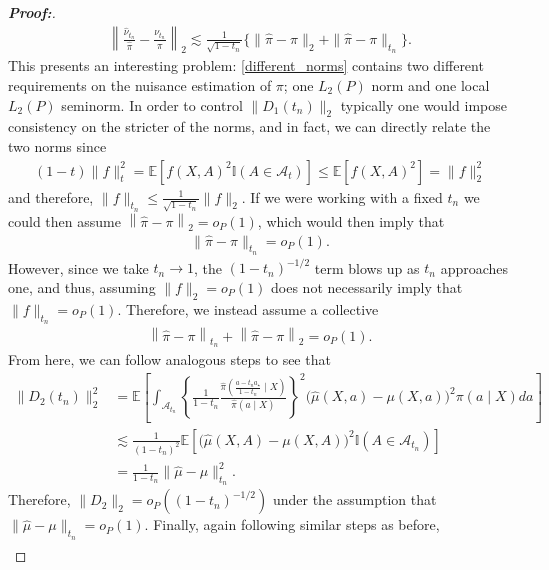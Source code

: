 \documentclass[11pt,twoside]{article}
\theoremstyle{definition}
\theoremstyle{remark}
\begin{document}
\begin{proof}[\textbf{Proof:}]
\begin{align} \label{different_norms}
    \left\| \frac{\widehat{\nu}_{t_n}}{\widehat{\pi}} - \frac{\nu_{t_n}}{\pi} \right\|_2 \lesssim \frac{1}{\sqrt{1 - t_n}} \Big\{ \|\widehat\pi-\pi\|_{2} + \|\widehat\pi-\pi\|_{t_n} \Big\}.
\end{align}
This presents an interesting problem: \cref{different_norms} contains two different requirements on the nuisance estimation of $\pi$; one $L_2(P)$ norm and one local $L_2(P)$ seminorm. In order to control $\|D_1(t_n)\|_2$ typically one would impose consistency on the stricter of the norms, and in fact, we can directly relate the two norms since
\begin{align*}
    (1-t ) \|f\|^2_{t} = \mathbb{E}\left[ f(X,A)^2\mathbb{I}(A\in\mathcal{A}_t) \right] \leq \mathbb{E}\left[ f(X,A)^2 \right] = \| f \|^2_2
\end{align*}
and therefore, $\|f\|_{t_n} \leq \frac{1}{\sqrt{1 - t_n}} \| f \|_2$. If we were working with a fixed $t_n$ we could then assume $\left\| \widehat{\pi}-\pi \right\|_{2} = o_P\left(1 \right)$, which would then imply that
\begin{align*}
    \|\widehat\pi-\pi\|_{t_n} = o_P(1).
\end{align*}
However, since we take $t_n \to 1$, the $(1 - t_n)^{-1/2}$ term blows up as $t_n$ approaches one, and thus, assuming $\|f\|_2 = o_P(1)$ does not necessarily imply that $\|f\|_{t_n} = o_P(1)$. Therefore, we instead assume a collective 
\begin{align*}
    \left\| \widehat{\pi}-\pi \right\|_{t_n} + \left\| \widehat{\pi}-\pi \right\|_{2} = o_P\left(1\right).
\end{align*}
From here, we can follow analogous steps to see that
\begin{align*}
    \| D_2(t_n) \|^2_2 &= \mathbb{E}\left[ \int_{\mathcal{A}_{t_n}} \left\{ \frac{1}{1-t_n} \frac{ \widehat\pi\left(\frac{a - t_n a_{\star}}{1 - t_n} \mid X\right)}{\widehat\pi(a\mid X)}\right\}^2 \Big( \widehat{\mu}(X, a) - \mu(X, a) \Big)^2 \pi(a\mid X)da \right]\\
    &\lesssim \frac{1}{(1-t_n)^2} \mathbb{E}\left[\Big( \widehat{\mu}(X, A) - \mu(X, A) \Big)^2 \mathbb{I}(A\in\mathcal{A}_{t_n}) \right]\\
    &= \frac{1}{1-t_n} \|\widehat\mu-\mu\|_{t_n}^2.
\end{align*}
Therefore,  $\|D_2\|_2 = o_P((1-t_n)^{-1/2})$ under the assumption that $\|\widehat\mu-\mu\|_{t_n} = o_P(1)$. Finally, again following similar steps as before,
\begin{align*}

\end{align*}
\end{proof}
\end{document}
